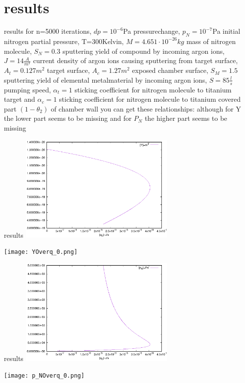 \documentclass{beamer}
\begin{document}
\section{results}
\begin{frame}{results}
	for n=5000 iterations, $dp=10^{-6}$Pa pressurechange, $p_N=10^{-7}$Pa initial nitrogen partial pressure, T=300Kelvin, $M=4.651\cdot10^{-26}kg$ mass of nitrogen molecule, $S_{N}=0.3$ sputtering yield of compound by incoming argon ions, $J=14\frac{A}{m^{2}}$ current density of argon ions causing sputtering from target surface, $A_{t}=0.127m^{2}$ target surface, $A_{c}=1.27m^{2}$ exposed chamber surface, $S_{M}=1.5$ sputtering yield of elemental metalmaterial by incoming argon ions, $S=85\frac{l}{s}$ pumping speed, $\alpha_{t}=1$ sticking coefficient for nitrogen molecule to titanium target and $\alpha_{c}=1$ sticking coefficient for nitrogen molecule to titanium covered part $(1-\theta_{2})$ of chamber wall you can get these relationships: although for Y the lower part seems to be missing and for $P_N$ the higher part seems to be missing
\end{frame}
\begin{frame}{results}
	\includegraphics[width=3in]{YOverq_0.ps}

	\texttt{[image: YOverq\_0.png]}
\end{frame}
\begin{frame}{results}
	\includegraphics[width=3in]{p_NOverq_0.ps}

	\texttt{[image: p\_NOverq\_0.png]}
\end{frame}
\end{document}
